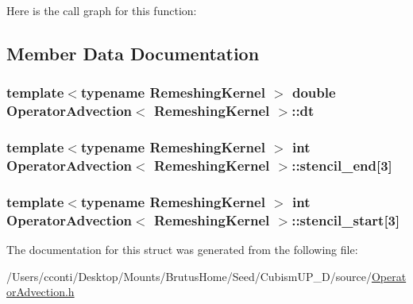 Here is the call graph for this function\+:




\subsection{Member Data Documentation}
\hypertarget{struct_operator_advection_a4a8f1b38860f0d05f233493c70654006}{}
\subsubsection[{dt}]{\setlength{\rightskip}{0pt plus 5cm}template$<$typename Remeshing\+Kernel $>$ double {\bf Operator\+Advection}$<$ Remeshing\+Kernel $>$\+::dt}\label{struct_operator_advection_a4a8f1b38860f0d05f233493c70654006}
\hypertarget{struct_operator_advection_af466cff8bcff47aa746cd5060fe4919d}{}
\subsubsection[{stencil\+\_\+end}]{\setlength{\rightskip}{0pt plus 5cm}template$<$typename Remeshing\+Kernel $>$ int {\bf Operator\+Advection}$<$ Remeshing\+Kernel $>$\+::stencil\+\_\+end\mbox{[}3\mbox{]}}\label{struct_operator_advection_af466cff8bcff47aa746cd5060fe4919d}
\hypertarget{struct_operator_advection_ae312bcebfc0be505d739796831a90648}{}
\subsubsection[{stencil\+\_\+start}]{\setlength{\rightskip}{0pt plus 5cm}template$<$typename Remeshing\+Kernel $>$ int {\bf Operator\+Advection}$<$ Remeshing\+Kernel $>$\+::stencil\+\_\+start\mbox{[}3\mbox{]}}\label{struct_operator_advection_ae312bcebfc0be505d739796831a90648}


The documentation for this struct was generated from the following file\+:\begin{DoxyCompactItemize}
\item 
/\+Users/cconti/\+Desktop/\+Mounts/\+Brutus\+Home/\+Seed/\+Cubism\+U\+P\+\_\+D/source/\hyperlink{_operator_advection_8h}{Operator\+Advection.\+h}\end{DoxyCompactItemize}
